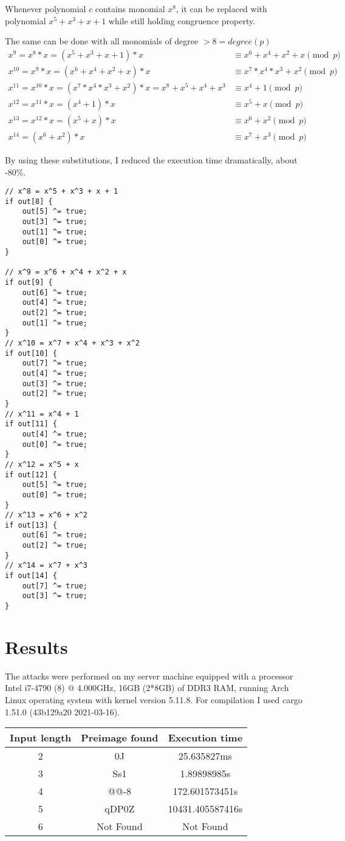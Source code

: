 \documentclass[runningheads,a4paper]{llncs}
\begin{document}
Whenever polynomial $c$ contains monomial $x^8$, it can be replaced with polynomial $x^5 + x^3 + x + 1$ while still holding congruence property.

The same can be done with all monomials of degree $> 8=degree(p)$
\begin{align*} 
x^9 = x^8 * x = (x^5 + x^3 + x + 1) * x &\equiv x^6 + x^4 + x^2 + x \pmod{p} \\
x^{10} = x^9 * x = (x^6 + x^4 + x^2 + x) * x &\equiv x^7 * x^4 * x^3 + x^2 \pmod{p} \\
x^{11} = x^{10} * x = (x^7 * x^4 * x^3 + x^2) * x = x^8 + x^5 + x^4 + x^3 &\equiv x^4 + 1 \pmod{p} \\
x^{12} = x^{11} * x = (x^4 + 1) * x &\equiv x^5 + x \pmod{p} \\
x^{13} = x^{12} * x = (x^5 + x) * x &\equiv x^6 + x^2 \pmod{p} \\
x^{14} = (x^6 + x^2) * x &\equiv x^7 + x^3 \pmod{p}
\end{align*} 

By using these substitutions, I reduced the execution time dramatically, about -80\%.
\begin{lstlisting}
// x^8 = x^5 + x^3 + x + 1
if out[8] {
    out[5] ^= true;
    out[3] ^= true;
    out[1] ^= true;
    out[0] ^= true;
}

// x^9 = x^6 + x^4 + x^2 + x
if out[9] {
    out[6] ^= true;
    out[4] ^= true;
    out[2] ^= true;
    out[1] ^= true;
}
// x^10 = x^7 + x^4 + x^3 + x^2
if out[10] {
    out[7] ^= true;
    out[4] ^= true;
    out[3] ^= true;
    out[2] ^= true;
}
// x^11 = x^4 + 1
if out[11] {
    out[4] ^= true;
    out[0] ^= true;
}
// x^12 = x^5 + x
if out[12] {
    out[5] ^= true;
    out[0] ^= true;
}
// x^13 = x^6 + x^2
if out[13] {
    out[6] ^= true;
    out[2] ^= true;
}
// x^14 = x^7 + x^3
if out[14] {
    out[7] ^= true;
    out[3] ^= true;
}
\end{lstlisting}


\section{Results}
The attacks were performed on my server machine equipped with a processor Intel i7-4790 (8) @ 4.000GHz, 16GB (2*8GB) of DDR3 RAM, running Arch Linux operating system with kernel version 5.11.8. For compilation I used cargo 1.51.0 (43b129a20 2021-03-16).


\begin{table}
\centering
\begin{tabular}{||c | c | c||} 

 \hline
Input length & Preimage found & Execution time   \\ [0.5ex] 
 \hline\hline
2            & 0J             & 25.635827ms      \\
3            & Ss1            & 1.89898985s      \\
4            & @@-8           & 172.601573451s   \\
5            & qDP0Z          & 10431.405587416s
   \\
6            & Not Found          & Not Found \\
\hline
\end{tabular}
\end{table}
\end{document}
